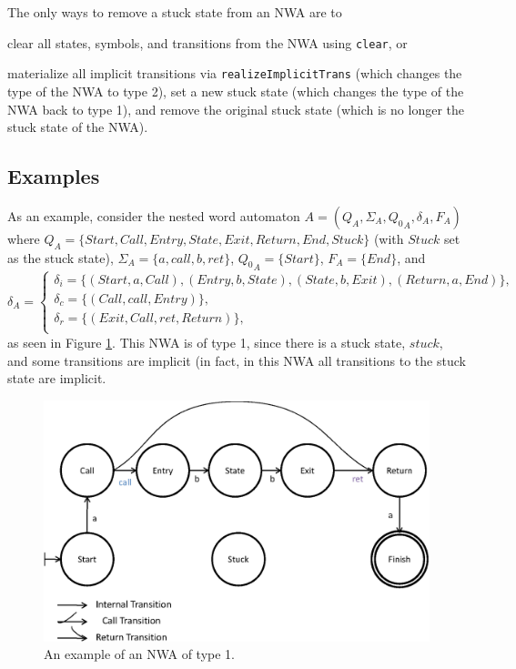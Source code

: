 \documentclass{llncs}
\begin{document}
The only ways to remove a stuck state from an NWA are to \begin{inparaenum} \item clear all states, symbols, and transitions from the NWA using \texttt{clear}, or \item materialize all implicit transitions via \texttt{realizeImplicitTrans} (which changes the type of the NWA to type 2), set a new stuck state (which changes the type of the NWA back to type 1), and remove the original stuck state (which is no longer the stuck state of the NWA).\end{inparaenum}


\subsection{Examples}
\label{Se:Examples}

As an example, consider the nested word automaton $A = (Q_A, \Sigma_A, {Q_0}_A, \delta_A, F_A)$ where $Q_A = \{Start, Call, Entry, State, Exit, Return, End, Stuck\}$ (with $Stuck$ set as the stuck state), $\Sigma_A = \{a, call, b, ret\}$, ${Q_0}_A = \{Start\}$, $F_A = \{End\}$, and \\
$\delta_A = 
\begin{cases} 
\delta_i = \{(Start,a,Call), (Entry,b,State), (State,b,Exit), (Return,a,End)\}, \\
\delta_c = \{(Call,call,Entry)\}, \\ 
\delta_r = \{(Exit,Call,ret,Return)\}, \\ 
\end{cases}$
as seen in Figure \ref{Fig:Example1}.  This NWA is of type 1, since there is a stuck state, $stuck$, and some transitions are implicit (in fact, in this NWA all transitions to the stuck state are implicit.  
 
\begin{figure}[htb]
  \centering
    \includegraphics[width=12cm]{Figures/Figure1.eps}
  \caption{An example of an NWA of type 1.}
  \label{Fig:Example1}
\end{figure}
\end{document}
